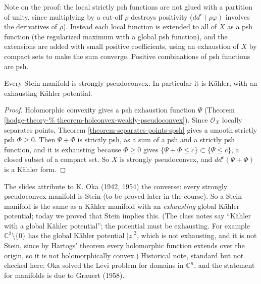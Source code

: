 \noindent
Note on the proof: the local strictly psh
functions are not glued with a partition of
unity, since multiplying by a cut-off $\rho$
destroys positivity ($dd^c(\rho\varphi)$
involves the derivatives of $\rho$). Instead
each local function is extended to all of $X$
as a psh function (the regularized maximum
with a global psh function), and the
extensions are added with small positive
coefficients, using an exhaustion of $X$ by
compact sets to make the sum converge.
Positive combinations of psh functions are
psh.

\begin{corollary}
\label{corollary-stein-strongly-pseudoconvex}
Every Stein manifold is strongly
pseudoconvex. In particular it is K\"ahler,
with an exhausting K\"ahler potential.
\end{corollary}

\begin{proof}
Holomorphic convexity gives a psh exhaustion
function $\Psi$ (Theorem
\ref{hodge-theory-%
theorem-holconvex-weakly-pseudoconvex}).
Since $\mathcal{O}_X$ locally separates
points, Theorem
\ref{theorem-separates-points-spsh} gives a
smooth strictly psh $\Phi\geq0$. Then
$\Psi+\Phi$ is strictly psh, as a sum of a
psh and a strictly psh function, and it is
exhausting because $\Phi\geq0$ gives
$\{\Psi+\Phi\leq c\}\subset\{\Psi\leq c\}$, a
closed subset of a compact set. So $X$ is
strongly pseudoconvex, and $dd^c(\Psi+\Phi)$
is a K\"ahler form.
\end{proof}

\begin{remark}
\label{remark-stein-oka}
The slides attribute to K. Oka (1942, 1954)
the converse: every strongly pseudoconvex
manifold is Stein (to be proved later in the
course). So a Stein manifold is the same as a
K\"ahler manifold with an \emph{exhausting}
global K\"ahler potential; today we proved
that Stein implies this. (The class notes say
``Kähler with a global Kähler potential'';
the potential must be exhausting. For example
$\mathbb{C}^2\setminus\{0\}$ has the global
K\"ahler potential $|z|^2$, which is not
exhausting, and it is not Stein, since by
Hartogs' theorem every holomorphic function
extends over the origin, so it is not
holomorphically convex.) Historical note,
standard but not checked here: Oka solved the
Levi problem for domains in $\mathbb{C}^n$,
and the statement for manifolds is due to
Grauert (1958).
\end{remark}

